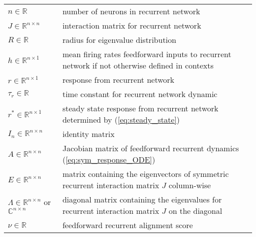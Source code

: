 \documentclass[11pt]{article}
\begin{document}
	\begin{table}[H]
		\begin{tabularx}{\textwidth}{lX}
			$n \in \mathbb{R}$  & number of neurons in recurrent network \\
			
			$J \in \mathbb{R}^{n \times n}$  & interaction matrix for recurrent network\\
			
			$R \in \mathbb{R}$  & radius for eigenvalue distribution \\
			
			$h \in \mathbb{R}^{n \times 1}$  & mean firing rates feedforward inputs to recurrent network if not otherwise defined in contexts\\
			
			$r \in \mathbb{R}^{n \times 1}$ & response from recurrent network \\
			
			$\tau_r \in \mathbb{R}$ & time constant for recurrent network dynamic \\
			
			$r^* \in \mathbb{R}^{n \times 1}$ & steady state response from recurrent network determined by (\ref{eq:steady_state}) \\
			
			$I_n \in \mathbb{R}^{n \times n}$ & identity matrix \\
			
			$A \in \mathbb{R}^{n \times n}$ & Jacobian matrix of feedforward recurrent dynamics (\ref{eq:sym_response_ODE}) \\
			
			$E \in \mathbb{R}^{n \times n}$ & matrix containing the eigenvectors of symmetric recurrent interaction matrix $J$ column-wise \\
			
			$\Lambda \in \mathbb{R}^{n \times n}$ or $\mathbb{C}^{n \times n}$ & diagonal matrix containing the eigenvalues for recurrent interaction matrix $J$ on the diagonal \\
			
			$\nu \in \mathbb{R}$ & feedforward recurrent alignment score\\
			

\end{tabularx}
\end{table}
\end{document}
